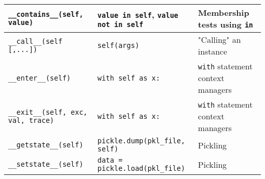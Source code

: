 \documentclass[a4paper,11pt]{article}
\newcommand{\code}[1]{\texttt{#1}}
\begin{document}
\begin{center}
\begin{tabular}{| p{5cm} | p{5cm} | p{5cm} |}
\hline
\code{__contains__(self, value)} & \code{value in self}, \code{value not in self} & Membership tests using \code{in}\\
\hline
\code{__call__(self [,...])} & \code{self(args)} & "Calling" an instance\\
\hline
\code{__enter__(self)} & \code{with self as x:} & \code{with} statement context managers\\
\hline
\code{__exit__(self, exc, val, trace)} & \code{with self as x:} & \code{with} statement context managers\\
\hline
\code{__getstate__(self)} & \code{pickle.dump(pkl_file, self)} & Pickling\\
\hline
\code{__setstate__(self)} & \code{data = pickle.load(pkl_file)} & Pickling\\
\hline
\end{tabular}
\end{center}
\end{document}
